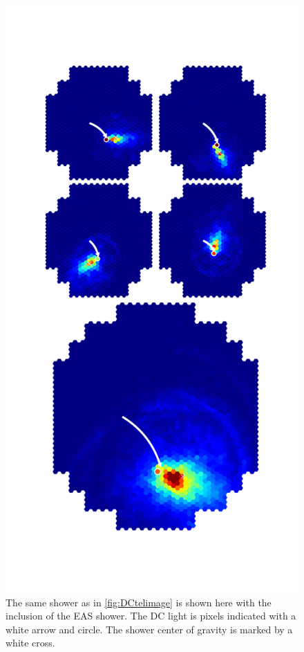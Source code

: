 \documentclass[11pt]{article}
\begin{document}
\begin{figure}
\begin{minipage}{0.45\textwidth}
\label{fig:DCtelimage}
\end{minipage}\hfill
\begin{minipage}{0.45\textwidth}
\centering
\includegraphics[trim=80 120 80 150,clip,width=\textwidth]{graphfull}
\caption{The same shower as in \ref{fig:DCtelimage} is shown here with the inclusion of the EAS shower. The DC light is pixels indicated with a white arrow and circle. The shower center of gravity is marked by a white cross.}
\label{fig:cutdistribution2}
\end{minipage}
\restoregeometry
\end{figure}
\end{document}
